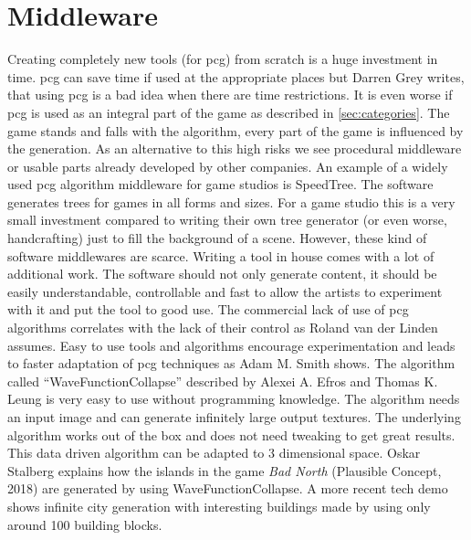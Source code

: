 \documentclass[10pt,a4paper]{article}
\begin{document}
\section{Middleware}\label{sec:Middleware}
\begin{multicols}{2}
Creating completely new tools (for \gls{pcg}) from scratch is a huge investment in time. \gls{pcg} can save time if used at the appropriate places but Darren Grey writes, that using \gls{pcg} is a bad idea when there are time restrictions\citep[p.~6]{Short:2017:PGG:3161477}. It is even worse if \gls{pcg} is used as an integral part of the game as described in \autoref{sec:categories}. The game stands and falls with the algorithm, every part of the game is influenced by the generation. As an alternative to this high risks we see procedural middleware or usable parts already developed by other companies. An example of a widely used \gls{pcg} algorithm middleware for game studios is SpeedTree\cite{SpeedTree}. The software generates trees for games in all forms and sizes. For a game studio this is a very small investment compared to writing their own tree generator (or even worse, handcrafting) just to fill the background of a scene. However, these kind of software middlewares are scarce. Writing a tool in house comes with a lot of additional work. The software should not only generate content, it should be easily understandable, controllable and fast to allow the artists to experiment with it and put the tool to good use. The commercial lack of use of \gls{pcg} algorithms correlates with the lack of their control as Roland van der Linden assumes\cite{VanderLinden2014}. Easy to use tools and algorithms encourage experimentation and leads to faster adaptation of \gls{pcg} techniques as Adam M. Smith shows\cite{Karth2017}. The algorithm called “WaveFunctionCollapse” described by Alexei A. Efros and Thomas K. Leung is very easy to use without programming knowledge\cite{Efros1999}. The algorithm needs an input image and can generate infinitely large output textures. The underlying algorithm works out of the box and does not need tweaking to get great results. This data driven algorithm can be adapted to 3 dimensional space. Oskar Stalberg explains how the islands in the game \textit{Bad North} (Plausible Concept, 2018) are generated by using WaveFunctionCollapse. A more recent tech demo shows infinite city generation with interesting buildings made by using only around 100 building blocks\cite{Marian2019}.
\end{multicols}
\end{document}
